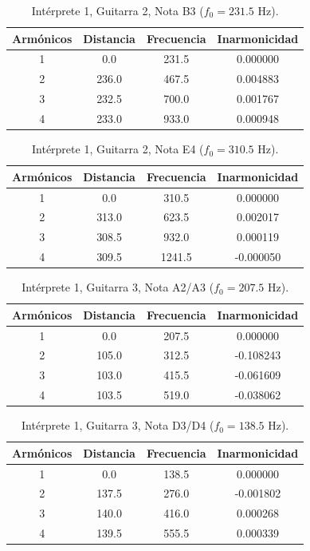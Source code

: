 \begin{table}[htbp]
  \centering
 \small
  \caption{Intérprete 1, Guitarra 2, Nota B3 ($f_0 = 231.5$ Hz).}
  \label{tab:interprete1_g2_b3}
  \begin{tabular}{cccc}
  \toprule
  Armónicos & Distancia & Frecuencia & Inarmonicidad \\
  \midrule
  1 & 0.0 & 231.5 & 0.000000 \\
  2 & 236.0 & 467.5 & 0.004883 \\
  3 & 232.5 & 700.0 & 0.001767 \\
  4 & 233.0 & 933.0 & 0.000948 \\
  \bottomrule
  \end{tabular}
\end{table}

\begin{table}[htbp]
  \centering
 \small
  \caption{Intérprete 1, Guitarra 2, Nota E4 ($f_0 = 310.5$ Hz).}
  \label{tab:interprete1_g2_e4}
  \begin{tabular}{cccc}
  \toprule
  Armónicos & Distancia & Frecuencia & Inarmonicidad \\
  \midrule
  1 & 0.0 & 310.5 & 0.000000 \\
  2 & 313.0 & 623.5 & 0.002017 \\
  3 & 308.5 & 932.0 & 0.000119 \\
  4 & 309.5 & 1241.5 & -0.000050 \\
  \bottomrule
  \end{tabular}
\end{table}

\begin{table}[htbp]
  \centering
 \small
  \caption{Intérprete 1, Guitarra 3, Nota A2/A3 ($f_0 = 207.5$ Hz).}
  \label{tab:interprete1_g3_a2_a3}
  \begin{tabular}{cccc}
  \toprule
  Armónicos & Distancia & Frecuencia & Inarmonicidad \\
  \midrule
  1 & 0.0 & 207.5 & 0.000000 \\
  2 & 105.0 & 312.5 & -0.108243 \\
  3 & 103.0 & 415.5 & -0.061609 \\
  4 & 103.5 & 519.0 & -0.038062 \\
  \bottomrule
  \end{tabular}
\end{table}

\begin{table}[htbp]
  \centering
 \small
  \caption{Intérprete 1, Guitarra 3, Nota D3/D4 ($f_0 = 138.5$ Hz).}
  \label{tab:interprete1_g3_d3_d4}
  \begin{tabular}{cccc}
  \toprule
  Armónicos & Distancia & Frecuencia & Inarmonicidad \\
  \midrule
  1 & 0.0 & 138.5 & 0.000000 \\
  2 & 137.5 & 276.0 & -0.001802 \\
  3 & 140.0 & 416.0 & 0.000268 \\
  4 & 139.5 & 555.5 & 0.000339 \\
  \bottomrule
  \end{tabular}
\end{table}

